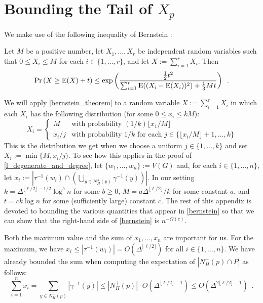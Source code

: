 \documentclass{patmorin}
\begin{document}



\appendix

\section{Bounding the Tail of \boldmath $X_p$}

We make use of the following inequality of Bernstein \cite[Corollary~2.11]{boucheron.lugosi.ea:concentration}:

\begin{thm}\label{bernstein_theorem}
  Let $M$ be a positive number, let $X_1,\ldots,X_r$ be independent random variables such that $0\le X_i\le M$ for each $i\in\{1,\ldots,r\}$, and let $X:=\sum_{i=1}^r X_i$. Then
  \begin{equation}
    \Pr\left(X \ge \mathrm{E}(X)+ t\right)
      \le \exp\left(\frac{\tfrac{1}{2}t^2}{\sum_{i=1}^r \mathrm{E}((X_i-\mathrm{E}(X_i))^2)+\tfrac{1}{3}Mt}\right) \enspace . \label{bernstein}
  \end{equation}
\end{thm}
We will apply \cref{bernstein_theorem} to a random variable $X:=\sum_{i=1}^r X_i$ in which each $X_i$ has the following distribution (for some $0\le x_i\le kM$):
\[
  X_i = \begin{cases}
          M & \text{with probability $(1/k)\lfloor x_1/M\rfloor$} \\
          x_i/j & \text{with probability $1/k$ for each $j\in\{\lfloor x_i/M\rfloor+1,\ldots,k\}$}
        \end{cases}
\]
This is the distribution we get when we choose a uniform $j\in\{1,\ldots,k\}$ and set $X_i:=\min\{M,x_i/j)$.  To see how this applies in the proof of \cref{l_degenerate_and_degree}, let $\{w_1,\ldots,w_n\}:=V(G)$ and, for each $i\in\{1,\ldots,n\}$, let $x_i:=|\tau^{-1}(w_i)\cap\left(\bigcup_{y\in N^+_H(p)}\gamma^{-1}(y)\right)|$.  In our setting $k=\Delta^{\lfloor\ell/2\rfloor-1/2}\log^b n$ for some $b\ge 0$,  $M=a\Delta^{\lfloor\ell/2\rfloor}/k$ for some constant $a$, and $t=ck\log n$ for some (sufficiently large) constant $c$.  The rest of this appendix is devoted to bounding the various quantities that appear in \cref{bernstein} so that we can show that the right-hand side of \cref{bernstein} is $n^{-\Omega(c)}$.

Both the maximum value and the sum of $x_1,\ldots,x_n$ are important for us. For the maximum, we have $x_i\le|\tau^{-1}(w_i)|= O(\Delta^{\lfloor\ell/2\rfloor})$ for all $i\in\{1,\ldots,n\}$.  We have already bounded the sum when computing the expectation of $|N_H^+(p)\cap P|$ as follows:
\[
  \sum_{i=1}^n x_i = \sum_{y\in N^+_H(p)} |\gamma^{-1}(y)|
  \le |N^+_H(p)|\cdot O(\Delta^{\lfloor\ell/2\rfloor-1})
  \le O(\Delta^{2\lfloor\ell/2\rfloor-1}) \enspace .
\]
\end{document}
